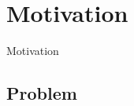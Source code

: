 \section{Motivation}
\begin{frame}
	\begin{center}
	\huge{Motivation}
	\end{center}
\end{frame}

\subsection*{Problem}


%
%
